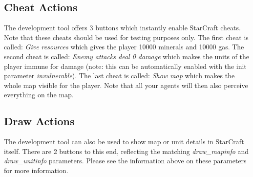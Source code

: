 \subsection{Cheat Actions}
The development tool offers 3 buttons which instantly enable StarCraft cheats. Note that these cheats should be used for testing purposes only. The first cheat is called: \textit{Give resources} which gives the player 10000 minerals and 10000 gas. The second cheat is called: \textit{Enemy attacks deal 0 damage} which makes the units of the player immune for damage (note: this can be automatically enabled with the init parameter \textit{invulnerable}). The last cheat is called: \textit{Show map} which makes the whole map visible for the player. Note that  all your agents will then also perceive everything on the map.

\subsection{Draw Actions}
The development tool can also be used to show map or unit details in StarCraft itself. There are 2 buttons to this end, reflecting the matching \textit{draw\_mapinfo} and \textit{draw\_unitinfo} parameters. Please see the information above on these parameters for more information.